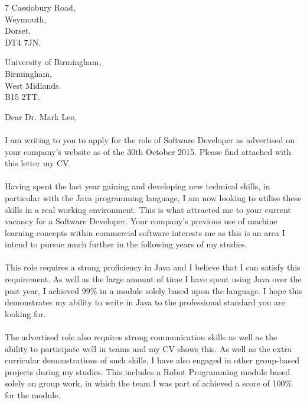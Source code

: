 \documentclass[12pt]{article}
\begin{document}

	\begin{flushright}
		7 Cassiobury Road,\\
		Weymouth,\\
		Dorset.\\
		DT4 7JN.
	\end{flushright}

	\begin{flushleft}
		University of Birmingham,\\
		Birmingham,\\
		West Midlands.\\
		B15 2TT.
	\end{flushleft}

	\begin{flushleft}
		Dear Dr. Mark Lee, 
		\paragraph{}
			I am writing to you to apply for the role of Software Developer as advertised on your company's website as of the 30th October 2015. Please find attached with this letter my CV.
	
		\paragraph{}
			Having spent the last year gaining and developing new technical skills, in particular with the Java programming language, I am now looking to utilise these skills in a real working environment. This is what attracted me to your current vacancy for a Software Developer. Your company's previous use of machine learning concepts within commercial software interests me as this is an area I intend to pursue much further in the following years of my studies.

		\paragraph{}
			This role requires a strong proficiency in Java and I believe that I can satisfy this requirement. As well as the large amount of time I have spent using Java over the past year, I achieved 99\% in a module solely based upon the language. I hope this demonstrates my ability to write in Java to the professional standard you are looking for.

		\paragraph{}
			The advertised role also requires strong communication skills as well as the ability to participate well in teams and my CV shows this. As well as the extra curricular demonstrations of such skills, I have also engaged in other group-based projects during my studies. This includes a Robot Programming module based solely on group work, in which the team I was part of achieved a score of 100\% for the module.


\end{flushleft}
\end{document}
